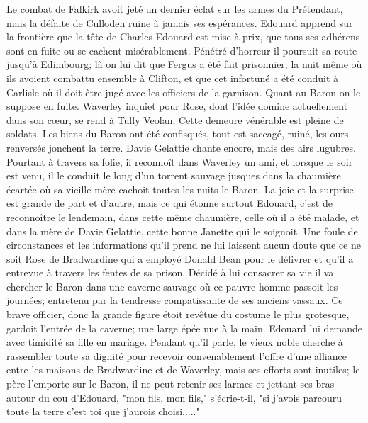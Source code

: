Le combat de Falkirk avoit jeté un dernier éclat sur les armes du Prétendant, mais la défaite de Culloden ruine à jamais ses espérances. Edouard apprend sur la frontière que la tête de Charles Edouard est mise à prix, que tous ses adhérens sont en fuite ou se cachent misérablement. Pénétré d'horreur il poursuit sa route jusqu'à Edimbourg; là on lui dit que Fergus a été fait\setcounter{page}{370} prisonnier, la nuit même où ils avoient combattu ensemble à Clifton, et que cet infortuné a été conduit à Carlisle où il doit être jugé avec les officiers de la garnison. Quant au Baron on le suppose en fuite. Waverley inquiet pour Rose, dont l'idée domine actuellement dans son cœur, se rend à Tully Veolan. Cette demeure vénérable est pleine de soldats. Les biens du Baron ont été confisqués, tout est saccagé, ruiné, les ours renversés jonchent la terre. Davie Gelattie chante encore, mais des airs lugubres. Pourtant à travers sa folie, il reconnoît dans Waverley un ami, et lorsque le soir est venu, il le conduit le long d'un torrent sauvage jusques dans la chaumière écartée où sa vieille mère cachoit toutes les nuits le Baron. La joie et la surprise est grande de part et d'autre, mais ce qui étonne surtout Edouard, c'est de reconnoître le lendemain, dans cette même chaumière, celle où il a été malade, et dans la mère de Davie Gelattie, cette bonne Janette qui le soignoit. Une foule de circonstances et les informations qu'il prend ne lui laissent aucun doute que ce ne soit Rose de Bradwardine qui a employé Donald Bean pour le délivrer et qu'il a entrevue à travers les fentes de sa prison. Décidé à lui consacrer sa vie il va\setcounter{page}{371} chercher le Baron dans une caverne sauvage où ce pauvre homme passoit les journées; entretenu par la tendresse compatissante de ses anciens vassaux. Ce brave officier, donc la grande figure étoit revêtue du costume le plus grotesque, gardoit l'entrée de la caverne; une large épée nue à la main. Edouard lui demande avec timidité sa fille en mariage. Pendant qu'il parle, le vieux noble cherche à rassembler toute sa dignité pour recevoir convenablement l'offre d'une alliance entre les maisons de Bradwardine et de Waverley, mais ses efforts sont inutiles; le père l'emporte sur le Baron, il ne peut retenir ses larmes et jettant ses bras autour du cou d'Edouard, "mon fils, mon fils," s'écrie-t-il, "si j'avois parcouru toute la terre c'est toi que j'aurois choisi....."

